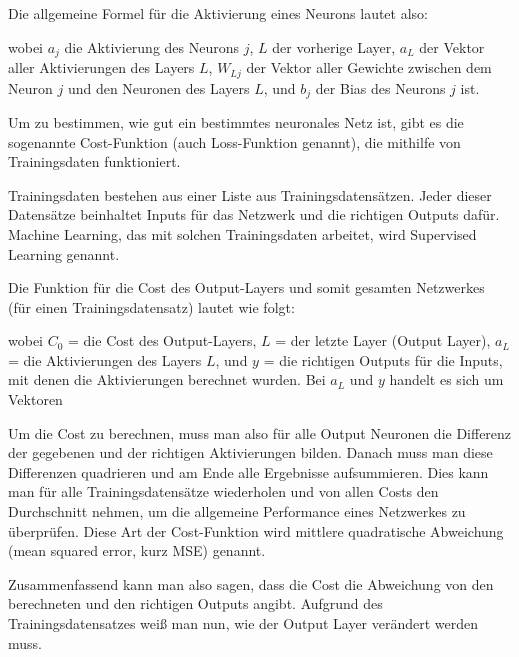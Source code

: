 \documentclass[11pt]{scrartcl}
\begin{document}
	{\newpage
	
	Die allgemeine Formel für die Aktivierung eines Neurons lautet also:}


	\form{
	\[
		\sig(x)=\frac{1}{1+e^{-x}}
		\]
	\[
		a_{j} = \sig\left(\sum_{L} (a_{L} * W_{Lj}) + b_{j}\right)
		\]}
	
	\noindent wobei $a_j$ die Aktivierung des Neurons $j$, $L$ der vorherige Layer, $a_L$ der Vektor aller Aktivierungen des Layers $L$, $W_{Lj}$ der Vektor aller Gewichte zwischen dem Neuron $j$ und den Neuronen des Layers $L$, und $b_j$ der Bias des Neurons $j$ ist. \cite{brotcrunsher:forwardpass}	
	

	Um zu bestimmen, wie gut ein bestimmtes neuronales Netz ist, gibt es die sogenannte Cost-Funktion (auch Loss-Funktion genannt), die mithilfe von Trainingsdaten funktioniert.
	
	Trainingsdaten bestehen aus einer Liste aus Trainingsdatensätzen. Jeder dieser Datensätze beinhaltet Inputs für das Netzwerk und die richtigen Outputs dafür. Machine Learning, das mit solchen Trainingsdaten arbeitet, wird Supervised Learning genannt.

	Die Funktion für die Cost des Output-Layers und somit gesamten Netzwerkes (für einen Trainingsdatensatz) lautet wie folgt:

	\form{ \[
		C_0 = (a_L - y)^2
	\]}


	\noindent wobei $C_0$ = die Cost des Output-Layers, $L$ = der letzte Layer (Output Layer), $a_L$ = die Aktivierungen des Layers $L$, und $y$ = die richtigen Outputs für die Inputs, mit denen die Aktivierungen berechnet wurden. 
	Bei $a_L$ und $y$ handelt es sich um Vektoren
	
	Um die Cost zu berechnen, muss man also für alle Output Neuronen die Differenz der gegebenen und der richtigen Aktivierungen bilden. Danach muss man diese Differenzen quadrieren und am Ende alle Ergebnisse aufsummieren. Dies kann man für alle Trainingsdatensätze wiederholen und von allen Costs den Durchschnitt nehmen, um die allgemeine Performance eines Netzwerkes zu überprüfen. Diese Art der Cost-Funktion wird mittlere quadratische Abweichung (mean squared error, kurz MSE) genannt. 
	
	Zusammenfassend kann man also sagen, dass die Cost die Abweichung von den berechneten und den richtigen Outputs angibt. Aufgrund des Trainingsdatensatzes weiß man nun, wie der Output Layer verändert werden
	muss.
\end{document}
